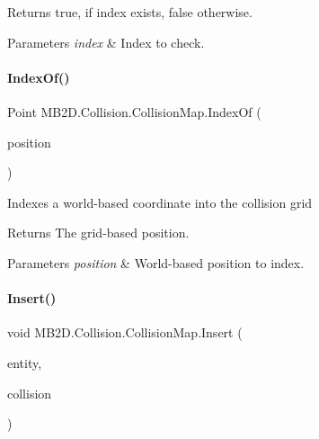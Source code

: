 \begin{DoxyReturn}{Returns}
{\ttfamily true}, if index exists, {\ttfamily false} otherwise.
\end{DoxyReturn}

\begin{DoxyParams}{Parameters}
{\em index} & Index to check.\\
\hline
\end{DoxyParams}
\hypertarget{class_m_b2_d_1_1_collision_1_1_collision_map_a738f7b15771993a037044aace6a6e09b}{}\label{class_m_b2_d_1_1_collision_1_1_collision_map_a738f7b15771993a037044aace6a6e09b} 
\paragraph{\texorpdfstring{Index\+Of()}{IndexOf()}}
{\footnotesize\ttfamily Point M\+B2\+D.\+Collision.\+Collision\+Map.\+Index\+Of (\begin{DoxyParamCaption}\item[{Point}]{position }\end{DoxyParamCaption})\hspace{0.3cm}{\ttfamily [inline]}}



Indexes a world-\/based coordinate into the collision grid 

\begin{DoxyReturn}{Returns}
The grid-\/based position.
\end{DoxyReturn}

\begin{DoxyParams}{Parameters}
{\em position} & World-\/based position to index.\\
\hline
\end{DoxyParams}
\hypertarget{class_m_b2_d_1_1_collision_1_1_collision_map_a7d53571c049d50d62e6132413fe712e3}{}\label{class_m_b2_d_1_1_collision_1_1_collision_map_a7d53571c049d50d62e6132413fe712e3} 
\paragraph{\texorpdfstring{Insert()}{Insert()}}
{\footnotesize\ttfamily void M\+B2\+D.\+Collision.\+Collision\+Map.\+Insert (\begin{DoxyParamCaption}\item[{\hyperlink{class_m_b2_d_1_1_entity_component_1_1_entity}{Entity}}]{entity,  }\item[{\hyperlink{class_m_b2_d_1_1_entity_component_1_1_collision_component}{Collision\+Component}}]{collision }\end{DoxyParamCaption})\hspace{0.3cm}{\ttfamily [inline]}}



